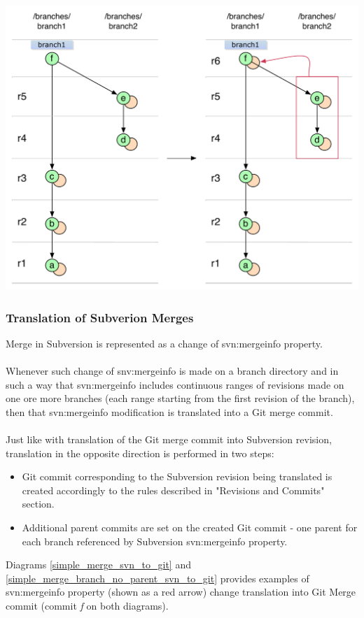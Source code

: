 \begin{center}
\includegraphics[width=\textwidth]{img/diagrams/simple_merge_branch_no_parent_git_to_svn.pdf}%
\label{simple_merge_branch_no_parent_git_to_svn}%
\end{center}

\subsubsection{Translation of Subverion Merges}

Merge in Subversion is represented as a change of svn:mergeinfo property.
\\\\
Whenever such change of snv:mergeinfo is made on a branch directory and in 
such a way that svn:mergeinfo includes continuous ranges of revisions
made on one ore more branches (each range starting from the first revision of the branch), then that svn:mergeinfo modification is translated into a Git merge commit.
\\\\
Just like with translation of the Git merge commit into Subversion revision, 
translation in the opposite direction is performed in two steps:
\begin{itemize}
\item Git commit corresponding to the Subversion revision being translated is created accordingly 
to the rules described in "Revisions and Commits" section.
\item Additional parent commits are set on the created Git commit - one parent for each branch
referenced by Subversion svn:mergeinfo property.
\end{itemize}
Diagrams \ref{simple_merge_svn_to_git} and \ref{simple_merge_branch_no_parent_svn_to_git} provides
examples of svn:mergeinfo property (shown as a red arrow) change translation into Git Merge commit (commit \emph{f} on both
diagrams).

